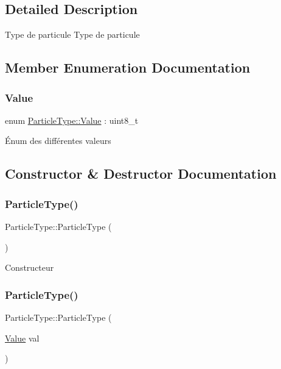 \subsection{Detailed Description}
Type de particule Type de particule 

\subsection{Member Enumeration Documentation}
\mbox{\label{classParticleType_a8b6a4b693e21bbda6c3a1181440df746}} 
\subsubsection{\texorpdfstring{Value}{Value}}
{\footnotesize\ttfamily enum \hyperlink{classParticleType_a8b6a4b693e21bbda6c3a1181440df746}{Particle\+Type\+::\+Value} \+: uint8\+\_\+t}

Énum des différentes valeurs 

\subsection{Constructor \& Destructor Documentation}
\mbox{\label{classParticleType_a7c3a02bc7a3e4baa6fd21d821e136bcb}} 
\subsubsection{\texorpdfstring{Particle\+Type()}{ParticleType()}\hspace{0.1cm}{\footnotesize\ttfamily [1/2]}}
{\footnotesize\ttfamily Particle\+Type\+::\+Particle\+Type (\begin{DoxyParamCaption}{ }\end{DoxyParamCaption})\hspace{0.3cm}{\ttfamily [default]}}

Constructeur \mbox{\label{classParticleType_a7eda5890caabbe807a1b4e875e0343eb}} 
\subsubsection{\texorpdfstring{Particle\+Type()}{ParticleType()}\hspace{0.1cm}{\footnotesize\ttfamily [2/2]}}
{\footnotesize\ttfamily Particle\+Type\+::\+Particle\+Type (\begin{DoxyParamCaption}\item[{\hyperlink{classParticleType_a8b6a4b693e21bbda6c3a1181440df746}{Value}}]{val }\end{DoxyParamCaption})}

